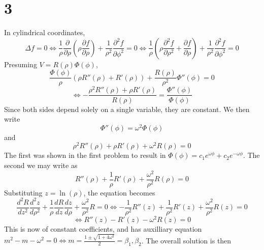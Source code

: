 \documentclass{article}
\begin{document}
\section*{3}
In cylindrical coordinates,
\[\Delta f = 0 \Leftrightarrow \frac{1}{\rho}\frac{\partial }{\partial \rho}\left( \rho\frac{\partial f}{\partial \rho} \right)+\frac{1}{\rho^2}\frac{\partial^2f}{\partial \phi^2}=0\Leftrightarrow \frac{1}{\rho}\left( \rho\frac{\partial^2 f}{\partial \rho^2}+\frac{\partial f}{\partial\rho}\right)+\frac{1}{\rho^2}\frac{\partial ^2 f}{\partial \phi^2}=0\]
Presuming $V=R(\rho)\Phi(\phi)$,
\[\frac{\Phi(\phi)}{\rho}\left( \rho R''(\rho)+R'(\rho)\right)+\frac{R(\rho)}{\rho^2}\Phi''(\phi)=0\]
\[\Leftrightarrow -\frac{\rho^2 R''(\rho)+\rho R'(\rho)}{R(\rho)}=\frac{\Phi''(\phi)}{\Phi(\phi)}\]
Since both sides depend solely on a single variable, they are constant. We then write
\[\Phi''(\phi)=\omega^2\Phi(\phi)\]
and
\[\rho^2R''(\rho)+\rho R'(\rho)+\omega^2R(\rho)=0\]
The first was shown in the first problem to result in $\Phi(\phi)=c_1e^{\omega \phi}+c_2e^{-\omega\phi}$.
The second we may write as \[R''(\rho)+\frac{1}{\rho} R'(\rho)+\frac{\omega^2}{\rho^2}R(\rho)=0\]
Substituting $z=\ln(\rho)$, the equation becomes
\[\frac{d^2 R}{dz^2}\frac{d^2z}{d\rho^2}+\frac{1}{\rho}\frac{d R}{dz}\frac{dz}{d\rho}+\frac{\omega^2}{\rho^2}R=0\Leftrightarrow -\frac{1}{\rho^2}R''(z)+\frac{1}{\rho^2}R'(z)+\frac{\omega^2}{\rho^2}R(z)=0\]
\[\Leftrightarrow R''(z)-R'(z)-\omega^2 R(z)=0\]
This is now of constant coefficients, and has auxilliary equation $m^2-m-\omega^2=0\Leftrightarrow m=\frac{1\pm\sqrt{1+4\omega^2}}{2}=\beta_1,\beta_2$. The overall solution is then
\end{document}

